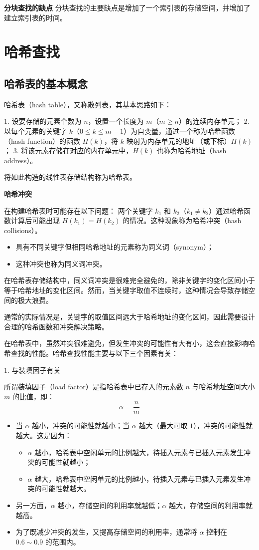 \documentclass[lang=cn,newtx,10pt,scheme=chinese]{elegantbook}
\begin{document}
\textbf{分块查找的缺点}  
分块查找的主要缺点是增加了一个索引表的存储空间，并增加了建立索引表的时间。
\section{哈希查找}
\subsection{哈希表的基本概念}

哈希表（hash table），又称散列表，其基本思路如下：

1. 设要存储的元素个数为 $n$，设置一个长度为 $m$（$m \geq n$）的连续内存单元；
2. 以每个元素的关键字 $k$（$0 \leq k \leq m-1$）为自变量，通过一个称为哈希函数（hash function）的函数 $H(k)$，将 $k$ 映射为内存单元的地址（或下标）$H(k)$；
3. 将该元素存储在对应的内存单元中，$H(k)$ 也称为哈希地址（hash address）。

将如此构造的线性表存储结构称为哈希表。


\textbf{哈希冲突}  

在构建哈希表时可能存在以下问题：  
两个关键字 $k_1$ 和 $k_2$（$k_1 \neq k_2$）通过哈希函数计算后可能出现 $H(k_1) = H(k_2)$ 的情况。这种现象称为哈希冲突（hash collisions）。  
\begin{itemize}
  \item 具有不同关键字但相同哈希地址的元素称为同义词（synonym）；
  \item 这种冲突也称为同义词冲突。
\end{itemize}

在哈希表存储结构中，同义词冲突是很难完全避免的，除非关键字的变化区间小于等于哈希地址的变化区间。然而，当关键字取值不连续时，这种情况会导致存储空间的极大浪费。

通常的实际情况是，关键字的取值区间远大于哈希地址的变化区间，因此需要设计合理的哈希函数和冲突解决策略。

在哈希表中，虽然冲突很难避免，但发生冲突的可能性有大有小，这会直接影响哈希查找的性能。哈希查找性能主要与以下三个因素有关：
  
  1. 与装填因子有关  

     所谓装填因子（load factor）是指哈希表中已存入的元素数 $n$ 与哈希地址空间大小 $m$ 的比值，即：
     \[
     \alpha = \frac{n}{m}
     \]
     \begin{itemize}
       \item 当 $\alpha$ 越小，冲突的可能性就越小；当 $\alpha$ 越大（最大可取 $1$），冲突的可能性就越大。这是因为：
         \begin{itemize}
           \item $\alpha$ 越小，哈希表中空闲单元的比例越大，待插入元素与已插入元素发生冲突的可能性就越小；
           \item $\alpha$ 越大，哈希表中空闲单元的比例越小，待插入元素与已插入元素发生冲突的可能性就越大。
         \end{itemize}
       \item 另一方面，$\alpha$ 越小，存储空间的利用率就越低；$\alpha$ 越大，存储空间的利用率就越高。
       \item 为了既减少冲突的发生，又提高存储空间的利用率，通常将 $\alpha$ 控制在 $0.6 \sim 0.9$ 的范围内。
     \end{itemize}
  
\end{document}
